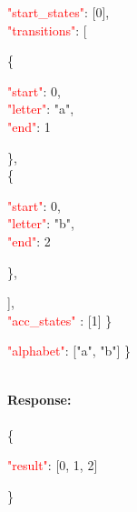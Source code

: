      \begin{adjustwidth}{7.5 mm}{0 cm}
     \begin{adjustwidth}{7.5 mm}{0 cm}
            \textcolor{red}{"start\_states"}: [0],\\
            \textcolor{red}{"transitions"}: [
            \begin{adjustwidth}{7.5 mm}{0 cm}
            \{
               \begin{adjustwidth}{7.5 mm}{0 cm}
                    \textcolor{red}{"start"}: 0,\\
                    \textcolor{red}{"letter"}: "a",\\
                    \textcolor{red}{"end"}: 1
               \end{adjustwidth}
            \}, \\
            \{
               \begin{adjustwidth}{7.5 mm}{0 cm}
                    \textcolor{red}{"start"}: 0,\\
                    \textcolor{red}{"letter"}: "b",\\
                    \textcolor{red}{"end"}: 2
               \end{adjustwidth}
            \},
            \end{adjustwidth}
            ],\\
        \textcolor{red}{"acc\_states" }: [1]  \}
    \end{adjustwidth}
    \end{adjustwidth}
   \begin{adjustwidth}{7.5 mm}{0 cm}
    \textcolor{red}{"alphabet"}: ["a", "b"] \}
    \end{adjustwidth}
\ \\
\textbf{Response:}\\
\ \\
\{
\begin{adjustwidth}{7.5 mm}{0 cm}
    \textcolor{red}{"result"}: [0, 1, 2]
\end{adjustwidth}
\}



